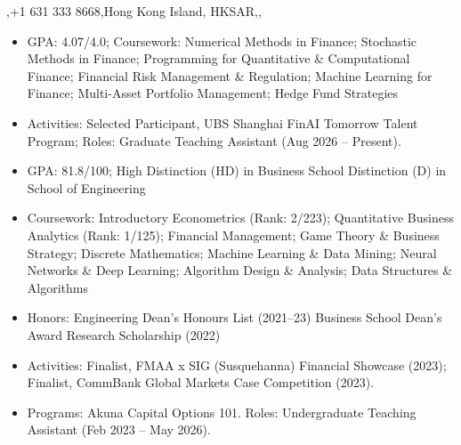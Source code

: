 \documentclass{article}
\begin{document}
  {\sep +1 631 333 8668\sep Hong Kong Island, HKSAR\sep \linkedin\sep \github}
\cvheaderend

\begin{itemize}
  \item GPA: 4.07/4.0; Coursework: Numerical Methods in Finance; Stochastic Methods in Finance; Programming for Quantitative \& Computational Finance; Financial Risk Management \& Regulation; Machine Learning for Finance; Multi-Asset Portfolio Management; Hedge Fund Strategies
  \item Activities: Selected Participant, UBS Shanghai FinAI Tomorrow Talent Program; Roles: Graduate Teaching Assistant (Aug 2026 -- Present).
\end{itemize}
\entrygap
{}
\begin{itemize}
  \item GPA: 81.8/100; High Distinction (HD) in Business School \textbar{} Distinction (D) in School of Engineering
  \item Coursework: Introductory Econometrics (Rank: 2/223); Quantitative Business Analytics (Rank: 1/125); Financial Management; Game Theory \& Business Strategy; Discrete Mathematics; Machine Learning \& Data Mining; Neural Networks \& Deep Learning; Algorithm Design \& Analysis; Data Structures \& Algorithms
  \item Honors: Engineering Dean's Honours List (2021--23) \textbar{} Business School Dean's Award \textbar{} Research Scholarship (2022)
  \item Activities: Finalist, FMAA x SIG (Susquehanna) Financial Showcase (2023); Finalist, CommBank Global Markets Case Competition (2023).
  \item Programs: Akuna Capital Options 101. Roles: Undergraduate Teaching Assistant (Feb 2023 -- May 2026).
\end{itemize}

\cvpublications
\end{document}
